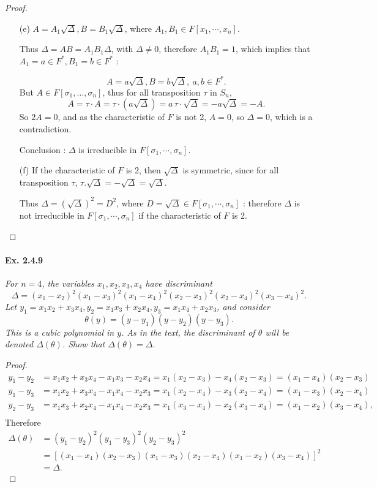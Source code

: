 \documentclass[11pt,a4paper]{article}
\begin{document}
\begin{proof}
\begin{enumerate}
\item[(e)] $A = A_1 \sqrt{\Delta}, B = B_1 \sqrt{\Delta}$, where $A_1,B_1 \in F[x_1,\cdots,x_n]$.

Thus $\Delta = AB = A_1B_1 \Delta$, with $\Delta \neq 0$, therefore $A_1B_1=1$, which implies that $A_1=a\in F^*,B_1=b\in F^*$ :

$$A = a \sqrt{\Delta}, B = b \sqrt{\Delta},\ a,b\in F^*.$$
But $A\in F[\sigma_1,\ldots,\sigma_n]$, thus for all transposition $\tau$ in $S_n$, $$A =\tau\cdot A = \tau\cdot(a\sqrt{\Delta})=a\, \tau\cdot \sqrt{\Delta} = -a\sqrt{\Delta}=-A.$$
So $2A = 0$, and as the characteristic of $F$ is not 2, $A=0$, so $\Delta = 0$, which is a contradiction.

Conclusion : $\Delta$ is irreducible in  $F[\sigma_1,\cdots,\sigma_n]$.


\item[(f)] 
If the characteristic of $F$ is 2, then $\sqrt{\Delta}$ is symmetric, since for all transposition $\tau$, $\tau.\sqrt{\Delta} = - \sqrt{\Delta} = \sqrt{\Delta}$.

Thus $\Delta = (\sqrt{\Delta})^2 = D^2$, where $D = \sqrt{\Delta} \in F[\sigma_1,\cdots,\sigma_n]$ : therefore $\Delta$ is not irreducible in $F[\sigma_1,\cdots,\sigma_n]$ if the characteristic of $F$ is 2.
\end{enumerate}
\end{proof}

\paragraph{Ex. 2.4.9}

{\it For $n=4$, the variables $x_1,x_2,x_3,x_4$ have discriminant
$$\Delta = (x_1-x_2)^2(x_1-x_3)^2(x_1-x_4)^2(x_2-x_3)^2(x_2-x_4)^2(x_3-x_4)^2.$$
Let $y_1 = x_1x_2+x_3x_4,y_2 = x_1x_3+x_2x_4,y_3=x_1x_4+x_2x_3$, and consider
$$\theta(y) = (y-y_1)(y-y_2)(y-y_3).$$
This is a cubic polynomial in $y$. As in the text, the discriminant of $\theta$ will be denoted $\Delta(\theta)$. Show that $\Delta(\theta) = \Delta$.
}

\begin{proof}
\begin{align*}
y_1-y_2 &= x_1x_2+x_3x_4-x_1x_3-x_2x_4=x_1(x_2-x_3)-x_4(x_2-x_3) =(x_1-x_4)(x_2-x_3)\\
y_1-y_3&= x_1x_2+x_3x_4-x_1x_4-x_2x_3=x_1(x_2-x_4)-x_3(x_2-x_4) =(x_1-x_3)(x_2-x_4)\\
y_2-y_3&= x_1x_3+x_2x_4-x_1x_4-x_2x_3=x_1(x_3-x_4)-x_2(x_3-x_4) =(x_1-x_2)(x_3-x_4),\\
\end{align*}
Therefore
\begin{align*}
\Delta(\theta) &= (y_1-y_2)^2(y_1-y_3)^2(y_2-y_3)^2\\
&=[(x_1-x_4)(x_2-x_3)(x_1-x_3)(x_2-x_4)(x_1-x_2)(x_3-x_4)]^2\\
&=\Delta.
\end{align*}
\end{proof}
\end{document}
